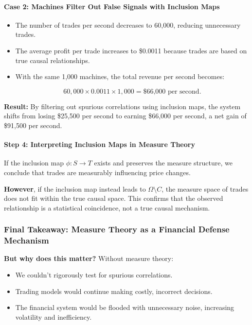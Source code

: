 \paragraph{Case 2: Machines Filter Out False Signals with Inclusion Maps}
\begin{itemize}
    \item The number of trades per second decreases to 60,000, reducing unnecessary trades.
    \item The average profit per trade increases to \$0.0011 because trades are based on true causal relationships.
    \item With the same 1,000 machines, the total revenue per second becomes:

    \[
    60,000 \times 0.0011 \times 1,000 = \text{\$66,000 per second}.
    \]

\end{itemize}

\textbf{Result:} By filtering out spurious correlations using inclusion maps, the system shifts from losing \$25,500 per second to earning \$66,000 per second, a net gain of \$91,500 per second.

\paragraph{Step 4: Interpreting Inclusion Maps in Measure Theory}

If the inclusion map \( \phi: S \to T \) exists and preserves the measure structure, we conclude that trades are measurably influencing price changes.

\textbf{However}, if the inclusion map instead leads to \( \Omega \setminus C \), the measure space of trades does not fit within the true causal space. This confirms that the observed relationship is a statistical coincidence, not a true causal mechanism.

\subsubsection*{Final Takeaway: Measure Theory as a Financial Defense Mechanism}

\textbf{But why does this matter?} Without measure theory:
\begin{itemize}
    \item We couldn’t rigorously test for spurious correlations.
    \item Trading models would continue making costly, incorrect decisions.
    \item The financial system would be flooded with unnecessary noise, increasing volatility and inefficiency.
\end{itemize}

